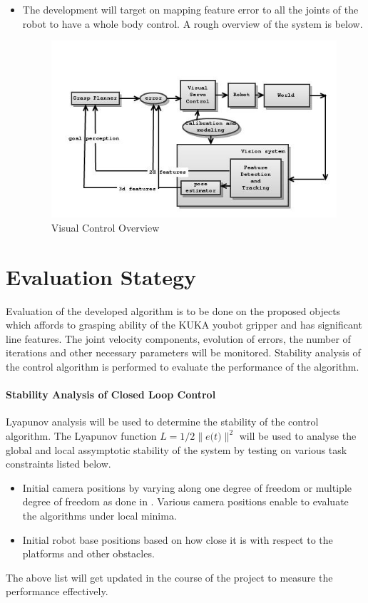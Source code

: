 \begin{itemize}
\item The development will target on mapping feature error to all the joints of the robot to have a whole body control. A rough overview of the system is below.
\begin{figure}[there]
 \vspace{2 mm}
  \centerline {\includegraphics[scale=0.6]{images/vs_youbot}}
  \caption{Visual Control Overview}
 \vspace{2 mm}
 \label{fig:viscont}
\end{figure}
\end{itemize}

\section{Evaluation Stategy}
Evaluation of the developed algorithm is to be done on the proposed objects which affords to grasping ability of the KUKA youbot gripper and has significant line features. The 
joint velocity components, evolution of errors, the number of iterations and other necessary parameters will be monitored. Stability analysis of the
control algorithm is performed to evaluate the performance of the algorithm.
\paragraph{Stability Analysis of Closed Loop Control}
Lyapunov analysis will be used to determine the stability of the control algorithm\cite{Hutchinson2006}. The Lyapunov function $L =  1/2\parallel  e  \big(t\big) \parallel ^{2}$
will be used to analyse the global and local assymptotic stability of the system by testing on various task constraints listed below.
\begin{itemize}
\item Initial camera positions by varying along one degree of freedom or multiple degree of freedom as done in \cite{jagersand1997experimental}. Various camera positions
enable to evaluate the algorithms under local minima.
\item Initial robot base positions based on how close it is with respect to the platforms and other obstacles. 
\end{itemize}
The above list will get updated in the course of the project to measure the performance effectively.








